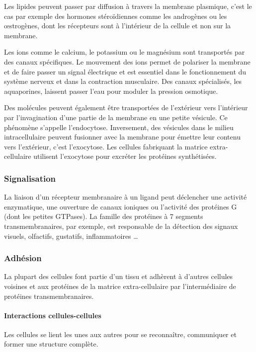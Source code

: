 Les lipides peuvent passer par diffusion à travers la membrane plasmique, c'est le cas par exemple des hormones stéroïdiennes comme les androgènes ou les \oe strogènes, dont les récepteurs sont à l'intérieur de la cellule et non sur la membrane.

Les ions comme le calcium, le potassium ou le magnésium sont transportés par des canaux spécifiques. Le mouvement des ions permet de polariser la membrane et de faire passer un signal électrique et est essentiel dans le fonctionnement du système nerveux et dans la contraction musculaire. Des canaux spécialisés, les aquaporines, laissent passer l'eau pour moduler la pression osmotique.

Des molécules peuvent également être transportées de l'extérieur vers l'intérieur par l'invagination d'une partie de la membrane en une petite vésicule. Ce phénomène s'appelle l'endocytose. Inversement, des vésicules dans le milieu intracellulaire peuvent fusionner avec la membrane pour émettre leur contenu vers l'extérieur, c'est l'exocytose. Les cellules fabriquant la matrice extra-cellulaire utilisent l'exocytose pour excréter les protéines synthétisées. 

\subsubsection{Signalisation}

La liaison d'un récepteur membranaire à un ligand peut déclencher une activité enzymatique, une ouverture de canaux ioniques ou l'activité des protéines G (dont les petites GTPases). 
La famille des protéines à 7 segments transmembranaires, par exemple, est responsable de la détection des signaux visuels, olfactifs, gustatifs, inflammatoires \dots

\subsubsection{Adhésion}

La plupart des cellules font partie d'un tissu et adhèrent à d'autres cellules voisines et aux protéines de la matrice extra-cellulaire par l'intermédiaire de protéines transmembranaires. 

\paragraph{Interactions cellules-cellules}
Les cellules se lient les unes aux autres pour se reconnaître, communiquer et former une structure complète. 

